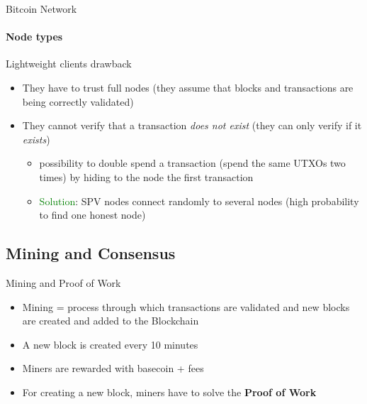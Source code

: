 \documentclass{beamer}
\begin{document}
  
  
  
  \begin{frame}{Bitcoin Network}
    \framesubtitle{Node types}
    \begin{block}{Lightweight clients drawback}
        \begin{itemize}
            \item They have to trust full nodes (they assume that blocks and transactions are being correctly validated)
            \item They cannot verify that a transaction \emph{does not exist} (they can only verify if it \emph{exists})
            \begin{itemize}
                \item[\MVRightarrow] possibility to double spend a transaction (spend the same UTXOs two times) by hiding to the node the first transaction
                \pause
                \item[\MVRightarrow] \textcolor{green}{Solution}: SPV nodes connect randomly to several nodes (high probability to find one honest node)
            \end{itemize}
        \end{itemize}
    \end{block}
  \end{frame}
  
  
  \subsection{Mining and Consensus}
  \begin{frame}{Mining and Proof of Work}
      \begin{itemize}
          \item Mining = process through which transactions are validated and new blocks are created and added to the Blockchain
          \item A new block is created every 10 minutes 
          \item Miners are rewarded with basecoin + fees
          \item For creating a new block, miners have to solve the \textbf{Proof of Work}
      \end{itemize}
  \end{frame}
  
  
  
\end{document}
